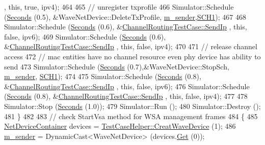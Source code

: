 \begin{DoxyCode}
      , \textcolor{keyword}{this}, \textcolor{keyword}{true}, ipv4);
464 
465     \textcolor{comment}{// unregister txprofile}
466     Simulator::Schedule (\hyperlink{group__timecivil_ga33c34b816f8ff6628e33d5c8e9713b9e}{Seconds} (0.5), &WaveNetDevice::DeleteTxProfile, 
      \hyperlink{classChannelRoutingTestCase_a0c6b6470849719fc90bbcbe4ee70eb76}{m\_sender},\hyperlink{channel-manager_8h_a456a1b730523e5d3b8a29fb227d10028}{SCH1});
467 
468     Simulator::Schedule (\hyperlink{group__timecivil_ga33c34b816f8ff6628e33d5c8e9713b9e}{Seconds} (0.6), &\hyperlink{classChannelRoutingTestCase_a2d9149c5bd4732d6d7d8d768bf3a0da1}{ChannelRoutingTestCase::SendIp}
      , \textcolor{keyword}{this}, \textcolor{keyword}{false}, ipv6);
469     Simulator::Schedule (\hyperlink{group__timecivil_ga33c34b816f8ff6628e33d5c8e9713b9e}{Seconds} (0.6), &\hyperlink{classChannelRoutingTestCase_a2d9149c5bd4732d6d7d8d768bf3a0da1}{ChannelRoutingTestCase::SendIp}
      , \textcolor{keyword}{this}, \textcolor{keyword}{false}, ipv4);
470 
471     \textcolor{comment}{// release channel access}
472     \textcolor{comment}{// mac entities have no channel resource even phy device has ability to send}
473     Simulator::Schedule (\hyperlink{group__timecivil_ga33c34b816f8ff6628e33d5c8e9713b9e}{Seconds} (0.7),&WaveNetDevice::StopSch, \hyperlink{classChannelRoutingTestCase_a0c6b6470849719fc90bbcbe4ee70eb76}{m\_sender}, 
      \hyperlink{channel-manager_8h_a456a1b730523e5d3b8a29fb227d10028}{SCH1});
474 
475     Simulator::Schedule (\hyperlink{group__timecivil_ga33c34b816f8ff6628e33d5c8e9713b9e}{Seconds} (0.8), &\hyperlink{classChannelRoutingTestCase_a2d9149c5bd4732d6d7d8d768bf3a0da1}{ChannelRoutingTestCase::SendIp}
      , \textcolor{keyword}{this}, \textcolor{keyword}{false}, ipv6);
476     Simulator::Schedule (\hyperlink{group__timecivil_ga33c34b816f8ff6628e33d5c8e9713b9e}{Seconds} (0.8), &\hyperlink{classChannelRoutingTestCase_a2d9149c5bd4732d6d7d8d768bf3a0da1}{ChannelRoutingTestCase::SendIp}
      , \textcolor{keyword}{this}, \textcolor{keyword}{false}, ipv4);
477 
478     Simulator::Stop (\hyperlink{group__timecivil_ga33c34b816f8ff6628e33d5c8e9713b9e}{Seconds} (1.0));
479     Simulator::Run ();
480     Simulator::Destroy ();
481   \}
482 
483   \textcolor{comment}{// check StartVsa method for WSA management frames}
484   \{
485     \hyperlink{classns3_1_1NetDeviceContainer}{NetDeviceContainer} devices = 
      \hyperlink{classTestCaseHelper_a24337801fa036883111fa1968606b57e}{TestCaseHelper::CreatWaveDevice} (1);
486     \hyperlink{classChannelRoutingTestCase_a0c6b6470849719fc90bbcbe4ee70eb76}{m\_sender} = DynamicCast<WaveNetDevice> (devices.\hyperlink{classns3_1_1NetDeviceContainer_a677d62594b5c9d2dea155cc5045f4d0b}{Get} (0));

\end{DoxyCode}
